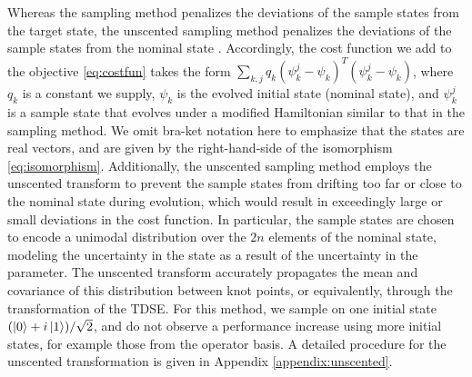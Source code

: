 Whereas the sampling method penalizes the deviations of the sample states
from the target state, the unscented sampling method
penalizes the deviations of the sample states from the nominal state
\cite{howell2020direct, lee2013sigma,
  thangavel2020robust}. Accordingly, the cost function we add
to the objective \eqref{eq:costfun} takes the form
$\sum_{k, j} q_{k} (\psi^{j}_{k} - \psi_{k})^{T}
(\psi^{j}_{k} - \psi_{k})$, where $q_{k}$ is a
constant we supply, $\psi_{k}$ is
the evolved initial state (nominal state), and $\psi^{j}_{k}$ is a sample state
that evolves under a modified Hamiltonian similar to that in the sampling method.
We omit bra-ket notation here to emphasize that
the states are real vectors, and are given by the right-hand-side of the
isomorphism \eqref{eq:isomorphism}. Additionally,
the unscented sampling method employs the unscented transform
\cite{julier2004unscented, uhlmann1995dynamic}
to prevent the sample states
from drifting too far or close to the nominal state during evolution,
which would result in exceedingly large or small deviations in the cost function.
In particular, the sample states are chosen to encode a unimodal distribution over
the $2n$ elements of the nominal state, modeling the uncertainty in the state
as a result of the uncertainty in the parameter. The unscented transform
accurately propagates the mean and covariance of this distribution between
knot points, or equivalently, through the transformation of the TDSE.
For this method, we sample on one initial state $(\ket{0} + i\ket{1}) / \sqrt{2}$,
and do not observe a performance increase
using more initial states, for example those from the operator basis.
A detailed procedure for the unscented transformation is given
in Appendix \ref{appendix:unscented}.

